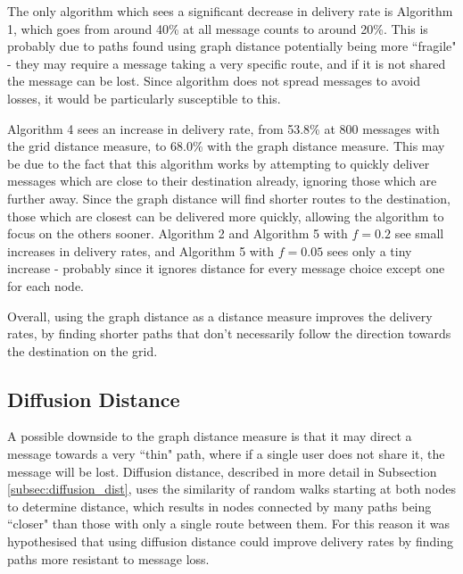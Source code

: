 \documentclass[bsc,frontabs,twoside,singlespacing,parskip,deptreport]{infthesis}     %
\begin{document}
The only algorithm which sees a significant decrease in delivery rate is Algorithm 1, which goes from around 40\% at all message counts to around 20\%. This is probably due to paths found using graph distance potentially being more ``fragile" - they may require a message taking a very specific route, and if it is not shared the message can be lost. Since algorithm does not spread messages to avoid losses, it would be particularly susceptible to this.

Algorithm 4 sees an increase in delivery rate, from 53.8\% at 800 messages with the grid distance measure, to 68.0\% with the graph distance measure. This may be due to the fact that this algorithm works by attempting to quickly deliver messages which are close to their destination already, ignoring those which are further away. Since the graph distance will find shorter routes to the destination, those which are closest can be delivered more quickly, allowing the algorithm to focus on the others sooner. Algorithm 2 and Algorithm 5 with $f=0.2$ see small increases in delivery rates, and Algorithm 5 with $f=0.05$ sees only a tiny increase - probably since it ignores distance for every message choice except one for each node.

Overall, using the graph distance as a distance measure improves the delivery rates, by finding shorter paths that don't necessarily follow the direction towards the destination on the grid.

\subsection{Diffusion Distance}
A possible downside to the graph distance measure is that it may direct a message towards a very ``thin" path, where if a single user does not share it, the message will be lost. Diffusion distance, described in more detail in Subsection \ref{subsec:diffusion_dist}, uses the similarity of random walks starting at both nodes to determine distance, which results in nodes connected by many paths being ``closer" than those with only a single route between them. For this reason it was hypothesised that using diffusion distance could improve delivery rates by finding paths more resistant to message loss.
\end{document}
